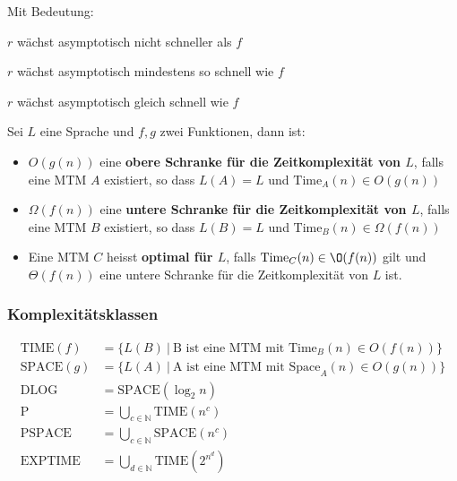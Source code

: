 \documentclass[11pt]{article}
\newcommand{\ttc}{\text{Time}}
\newcommand{\tsc}{\text{Space}}
\begin{document}
Mit Bedeutung:
\begin{description}[labelindent=16pt,style=multiline,leftmargin=3cm, noitemsep]
	\item[$r \in 0(f(n))$:] $r$ w{\"a}chst asymptotisch nicht schneller als $f$
	\item[$s \in \Omega(f(n))$:] $r$ w{\"a}chst asymptotisch mindestens so schnell wie $f$
	\item[$q \in \Theta(f(n))$:] $r$ w{\"a}chst asymptotisch gleich schnell wie $f$
\end{description}

Sei $L$ eine Sprache und $f,g$ zwei Funktionen, dann ist:
\begin{itemize}[noitemsep]
	\item $O(g(n))$ eine \textbf{obere Schranke f{\"u}r die Zeitkomplexit{\"a}t von $L$}, falls eine MTM $A$ existiert, so dass $L(A) = L$ und $\ttc_A(n) \in O(g(n))$
	\item $\Omega(f(n))$ eine \textbf{untere Schranke f{\"u}r die Zeitkomplexit{\"a}t von $L$}, falls eine MTM $B$ existiert, so dass $L(B) = L$ und $\ttc_B(n) \in \Omega(f(n))$
	\item Eine MTM $C$ heisst \textbf{optimal f{\"u}r $L$}, falls $\ttc_C(n) \in \O(f(n))$ gilt und $\Theta(f(n))$ eine untere Schranke f{\"u}r die Zeitkomplexit{\"a}t von $L$ ist.
\end{itemize}

\subsubsection{Komplexit{\"a}tsklassen}

\begin{equation*}
\begin{split}
	\text{TIME}(f) & = \{L(B)\ |\ \text{B ist eine MTM mit } \ttc_B(n) \in O(f(n))\} \\
	\text{SPACE}(g) & = \{L(A)\ |\ \text{A ist eine MTM mit } \tsc_A(n) \in O(g(n))\} \\
	\text{DLOG} & = \text{SPACE}(\log_2 n) \\
	\text{P} & = \bigcup_{c \in \mathbb{N}} \text{TIME}(n^c) \\
	\text{PSPACE} & = \bigcup_{c \in \mathbb{N}} \text{SPACE}(n^c) \\
	\text{EXPTIME} & = \bigcup_{d \in \mathbb{N}} \text{TIME}(2^{n^d}) \\
\end{split}
\end{equation*}
\end{document}
